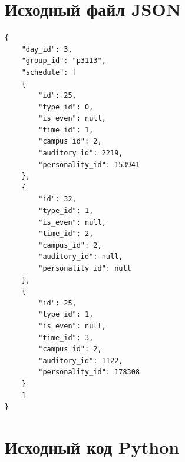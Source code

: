 \documentclass[11pt]{article}
\begin{document}
\section{Исходный файл JSON}
\label{sec:org0da2fc2}
\scriptsize
\lstset{language=json,label= ,caption= ,captionpos=b,numbers=none}
\begin{lstlisting}
{
    "day_id": 3,
    "group_id": "p3113",
    "schedule": [
	{
	    "id": 25,
	    "type_id": 0,
	    "is_even": null,
	    "time_id": 1,
	    "campus_id": 2,
	    "auditory_id": 2219,
	    "personality_id": 153941
	},
	{
	    "id": 32,
	    "type_id": 1,
	    "is_even": null,
	    "time_id": 2,
	    "campus_id": 2,
	    "auditory_id": null,
	    "personality_id": null
	},
	{
	    "id": 25,
	    "type_id": 1,
	    "is_even": null,
	    "time_id": 3,
	    "campus_id": 2,
	    "auditory_id": 1122,
	    "personality_id": 178308
	}
    ]
}
\end{lstlisting}

\section{Исходный код Python}
\label{sec:org29eb5d3}
\end{document}
